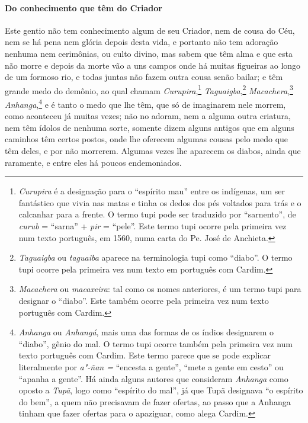 \begin{linenumbers}
\paragraph{Do conhecimento que têm do Criador}\quad
 Este gentio não tem conhecimento algum de seu Criador, nem de cousa do
Céu, nem se há pena nem glória depois desta vida, e portanto não tem
adoração nenhuma nem cerimônias, ou culto divino, mas sabem que têm
alma e que esta não morre e depois da morte vão a uns campos onde há
muitas figueiras ao longo de um formoso rio, e todas juntas não fazem
outra cousa senão bailar; e têm grande medo do demônio, ao qual chamam
\textit{Curupira},\footnote{ \textit{Curupira} é a designação para o
``espírito mau'' entre os indígenas, um ser fantástico que vivia nas
matas e tinha os dedos dos pés voltados para trás e o calcanhar para a
frente. O termo tupi pode ser traduzido por ``sarnento'', de
\textit{curub} = ``sarna'' + \textit{pir} = ``pele''. Este termo tupi
ocorre pela primeira vez num texto português, em 1560, numa
carta do Pe. José de Anchieta.} \textit{Taguaigba},\footnote{ \textit{Taguaigba} 
ou \textit{taguaiba} aparece na
terminologia tupi como ``diabo''. O termo tupi ocorre pela primeira vez
num texto em português com Cardim.} \textit{Macachera},\footnote{ \textit{Macachera} ou \textit{macaxeira}: tal como os
nomes anteriores, é um termo tupi para designar o ``diabo''. Este também
ocorre pela primeira vez num texto português com Cardim.} \textit{
Anhanga},\footnote{ \textit{Anhanga} ou \textit{Anhangá}, mais uma
das formas de os índios designarem o ``diabo'', gênio do mal. O termo
tupi ocorre também pela primeira vez num texto português com Cardim.
Este termo parece que se pode explicar literalmente por \textit{a"-ñan =}
``encesta a gente'', ``mete a gente em cesto'' ou ``apanha a gente''. Há
ainda alguns autores que consideram \textit{Anhanga} como oposto a
\textit{Tupã}, logo como ``espírito do mal'', já que Tupã designava ``o
espírito do bem'', a quem não precisavam de fazer ofertas, ao passo que
a Anhanga tinham que fazer ofertas para o apaziguar, como alega
Cardim.}  e é tanto o medo que lhe têm, que só de imaginarem
nele morrem, como aconteceu já muitas vezes; não no adoram, nem a
alguma outra criatura, nem têm ídolos de nenhuma sorte, somente dizem
alguns antigos que em alguns caminhos têm certos postos, onde lhe
oferecem algumas cousas pelo medo que têm deles, e por não morrerem.
Algumas vezes lhe aparecem os diabos, ainda que raramente, e entre eles
há poucos endemoniados.


\end{linenumbers}
